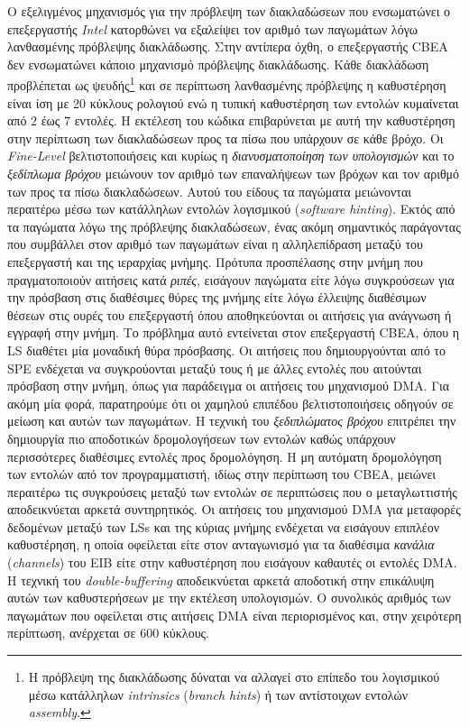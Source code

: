 Ο εξελιγμένος μηχανισμός για την πρόβλεψη των διακλαδώσεων που ενσωματώνει ο επεξεργαστής \textsl{Intel} κατορθώνει να εξαλείψει τον αριθμό των παγωμάτων λόγω λανθασμένης πρόβλεψης διακλάδωσης. Στην αντίπερα όχθη, ο επεξεργαστής \ac{CBEA} δεν ενσωματώνει κάποιο μηχανισμό πρόβλεψης διακλάδωσης. Κάθε διακλάδωση προβλέπεται ως ψευδής\footnote{\small Η πρόβλεψη της διακλάδωσης δύναται να αλλαγεί στο επίπεδο του λογισμικού μέσω κατάλληλων \textsl{intrinsics} (\textsl{branch hints}) ή των αντίστοιχων εντολών \textsl{assembly}.} και σε περίπτωση λανθασμένης πρόβλεψης η καθυστέρηση είναι ίση με 20 κύκλους ρολογιού ενώ η τυπική καθυστέρηση των εντολών κυμαίνεται από \(2\) έως \(7\) εντολές. Η εκτέλεση του κώδικα επιβαρύνεται με αυτή την καθυστέρηση στην περίπτωση των διακλαδώσεων προς τα πίσω που υπάρχουν σε κάθε βρόχο. Οι \textsl{Fine-Level} βελτιστοποιήσεις και κυρίως η \textsl{διανυσματοποίηση των υπολογισμών} και το \textsl{ξεδίπλωμα βρόχου} μειώνουν τον αριθμό των επαναλήψεων των βρόχων και τον αριθμό των προς τα πίσω διακλαδώσεων. Αυτού του είδους τα παγώματα μειώνονται περαιτέρω μέσω των κατάλληλων εντολών λογισμικού (\textsl{software hinting}).\newline \indent
Εκτός από τα παγώματα λόγω της πρόβλεψης διακλαδώσεων, ένας ακόμη σημαντικός παράγοντας που συμβάλλει στον αριθμό των παγωμάτων είναι η αλληλεπίδραση μεταξύ του επεξεργαστή και της ιεραρχίας μνήμης. Πρότυπα προσπέλασης στην μνήμη που πραγματοποιούν αιτήσεις κατά \textsl{ριπές}, εισάγουν παγώματα είτε λόγω συγκρούσεων για την πρόσβαση στις διαθέσιμες θύρες της μνήμης είτε λόγω έλλειψης διαθέσιμων θέσεων στις ουρές του επεξεργαστή όπου αποθηκεύονται οι αιτήσεις για ανάγνωση ή εγγραφή στην μνήμη.\newline \indent 
Το πρόβλημα αυτό εντείνεται στον επεξεργαστή \ac{CBEA}, όπου η \ac{LS} διαθέτει μία μοναδική θύρα πρόσβασης. Οι αιτήσεις που δημιουργούνται από το \ac{SPE} ενδέχεται να συγκρούονται μεταξύ τους ή με άλλες εντολές που αιτούνται πρόσβαση στην μνήμη, όπως για παράδειγμα οι αιτήσεις του μηχανισμού \ac{DMA}. Για ακόμη μία φορά, παρατηρούμε ότι οι χαμηλού επιπέδου βελτιστοποιήσεις οδηγούν σε μείωση και αυτών των παγωμάτων. Η τεχνική του \textsl{ξεδιπλώματος βρόχου} επιτρέπει την δημιουργία πιο αποδοτικών δρομολογήσεων των εντολών καθώς υπάρχουν περισσότερες διαθέσιμες εντολές προς δρομολόγηση. Η μη αυτόματη δρομολόγηση των εντολών από τον προγραμματιστή, ιδίως στην περίπτωση του \ac{CBEA}, μειώνει περαιτέρω τις συγκρούσεις μεταξύ των εντολών σε περιπτώσεις που ο μεταγλωττιστής αποδεικνύεται αρκετά συντηρητικός.\newline \indent
Οι αιτήσεις του μηχανισμού \ac{DMA} για μεταφορές δεδομένων μεταξύ των \ac{LS}s και της κύριας μνήμης ενδέχεται να εισάγουν επιπλέον καθυστέρηση, η οποία οφείλεται είτε στον ανταγωνισμό για τα διαθέσιμα \textsl{κανάλια} (\textsl{channels}) του \ac{EIB} είτε στην καθυστέρηση που εισάγουν καθαυτές οι εντολές \ac{DMA}. Η τεχνική του \textsl{double-buffering} αποδεικνύεται αρκετά αποδοτική στην επικάλυψη αυτών των καθυστερήσεων με την εκτέλεση υπολογισμών. Ο συνολικός αριθμός των παγωμάτων που οφείλεται στις αιτήσεις \ac{DMA} είναι περιορισμένος και, στην χειρότερη περίπτωση, ανέρχεται σε \(600\) κύκλους.

